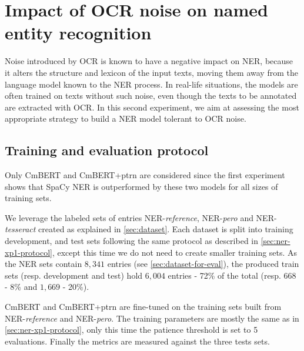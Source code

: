 \section{Impact of OCR noise on named entity recognition}
\label{sec:ner-xp2}
Noise introduced by OCR is known to have a negative impact on NER, because it alters the structure and lexicon of the input texts, moving them away from the language model known to the NER process.
In real-life situations, the models are often trained on texts without such noise, even though the texts to be annotated are extracted with OCR.
In this second experiment, we aim at assessing the most appropriate strategy to build a NER model tolerant to OCR noise.


\subsection{Training and evaluation protocol}
Only CmBERT and CmBERT+ptrn are considered since the first experiment shows that SpaCy NER is outperformed by these two models for all sizes of training sets.

We leverage the labeled sets of entries NER-\emph{reference}, NER-\emph{pero} and NER-\emph{tesseract} created as explained in \cref{sec:dataset}.
Each dataset is split into training development, and test sets following the same protocol as described in \cref{sec:ner-xp1-protocol}, except this time we do not need to create smaller training sets.
As the NER sets contain $8,341$ entries (see \cref{sec:dataset-for-eval}), the produced train sets (resp. development and test) hold $6,004$ entries - 72\% of the total (resp. 668 - 8\% and $1,669$ - 20\%).    

CmBERT and CmBERT+ptrn are fine-tuned on the training sets built from NER-\emph{reference} and NER-\emph{pero}.
The training parameters are mostly the same as in \cref{sec:ner-xp1-protocol}, only this time the patience threshold is set to 5 evaluations.
Finally the metrics are measured against the three tests sets.






